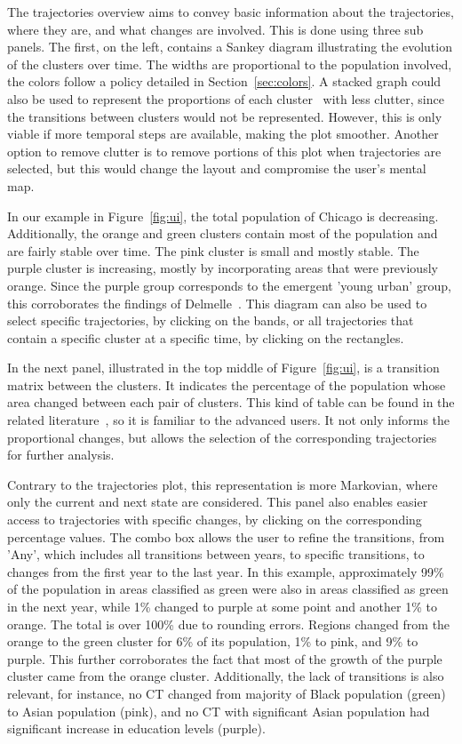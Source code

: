 The trajectories overview aims to convey basic information about the
trajectories, where they are, and what changes are involved. This is done using
three sub panels. The first, on the left, contains a Sankey diagram illustrating
the evolution of the clusters over time. The widths are proportional to the
population involved, the colors follow a policy detailed in
Section~\ref{sec:colors}. A stacked graph could also be used to represent the
proportions of each cluster~\cite{Valdivia2015} with less clutter, since the
transitions between clusters would not be represented. However, this is only
viable if more temporal steps are available, making the plot smoother. Another
option to remove clutter is to remove portions of this plot when trajectories
are selected, but this would change the layout and compromise the user's mental
map.


In our example in Figure~\ref{fig:ui}, the total population of Chicago is
decreasing. Additionally, the orange and green clusters contain most of the
population and are fairly stable over time. The pink cluster is small and mostly
stable. The purple cluster is increasing, mostly by incorporating areas that
were previously orange. Since the purple group corresponds to the emergent
'young urban' group, this corroborates the findings of
Delmelle~\cite{Delmelle2016,Delmelle2017}. This diagram can also be used to
select specific trajectories, by clicking on the bands, or all trajectories that
contain a specific cluster at a specific time, by clicking on the rectangles.


In the next panel, illustrated in the top middle of Figure~\ref{fig:ui}, is a
transition matrix between the clusters. It indicates the percentage of the
population whose area changed between each pair of clusters. This kind of table
can be found in the related literature~\cite{Delmelle2016}, so it is familiar to
the advanced users. It not only informs the proportional changes, but allows the
selection of the corresponding trajectories for further analysis.

Contrary to the trajectories plot, this representation is more Markovian, where
only the current and next state are considered. This panel also enables easier
access to trajectories with specific changes, by clicking on the corresponding
percentage values. The combo box allows the user to refine the transitions, from
'Any', which includes all transitions between years, to specific transitions, to
changes from the first year to the last year. In this example, approximately
99\% of the population in areas classified as green were also in areas
classified as green in the next year, while 1\% changed to purple at some point
and another 1\% to orange. The total is over 100\% due to rounding errors.
Regions changed from the orange to the green cluster for 6\% of its population,
1\% to pink, and 9\% to purple. This further corroborates the fact that most of
the growth of the purple cluster came from the orange cluster. Additionally, the
lack of transitions is also relevant, for instance, no CT changed from majority
of Black population (green) to Asian population (pink), and no CT with
significant Asian population had significant increase in education levels
(purple).

